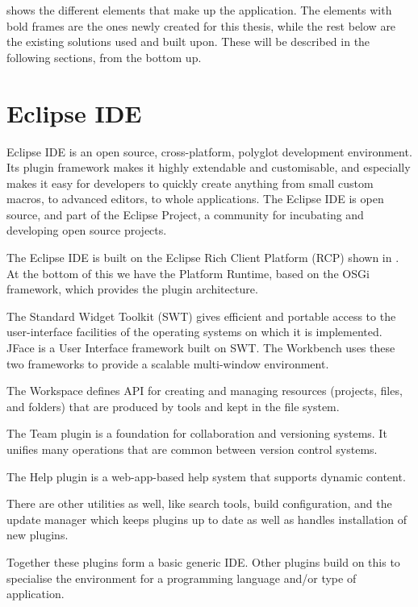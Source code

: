 	 shows the different elements that make up the application.
	The elements with bold frames are the ones newly created for this thesis, while
	the rest below are the existing solutions used and built upon. These will be
	described in the following sections, from the bottom up.

\section{Eclipse IDE}
Eclipse IDE \cite{eclipse} is an open source, cross-platform, polyglot
development environment.
Its plugin framework makes it highly extendable and customisable, and
especially makes it easy for developers to quickly create anything from small
custom macros, to advanced editors, to whole applications. The Eclipse IDE is
open source, and part of the Eclipse Project, a community for incubating and
developing open source projects.


The Eclipse IDE is built on the Eclipse Rich Client Platform (RCP) shown in
. At the bottom of this we have the Platform Runtime, based
on the OSGi framework, which provides the plugin architecture.

The Standard Widget Toolkit (SWT) gives efficient and portable access to the
user-interface facilities of the operating systems on which it is implemented.
JFace is a User Interface framework built on SWT. The Workbench uses these two
frameworks to provide a scalable multi-window environment. 

The Workspace defines API for creating and managing resources (projects, files,
and folders) that are produced by tools and kept in the file system.

The Team plugin is a foundation for collaboration and versioning systems. It
unifies many operations that are common between version control systems.

The Help plugin is a web-app-based help system that supports dynamic content.

There are other utilities as well, like search tools, build configuration, and
the update manager which keeps plugins up to date as well as handles
installation of new plugins.

Together these plugins form a basic generic IDE. Other plugins build on this to
specialise the environment for a programming language and/or type of
application.

